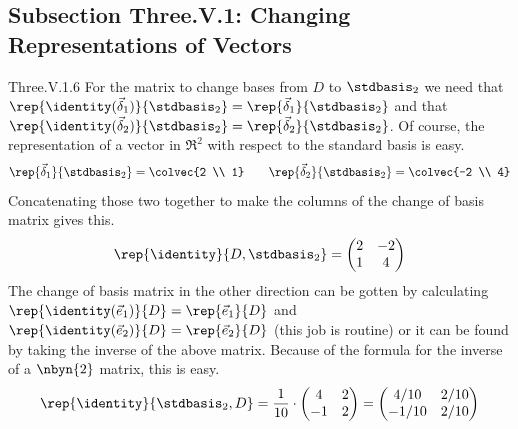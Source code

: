 \subsection{Subsection Three.V.1: Changing Representations of Vectors}
\begin{ans}{Three.V.1.6}
      For the matrix to change bases from $D$ to $\stdbasis_2$ we need that
      $\rep{\identity(\vec{\delta}_1)}{\stdbasis_2}
        =\rep{\vec{\delta}_1}{\stdbasis_2}$
      and that
      $\rep{\identity(\vec{\delta}_2)}{\stdbasis_2}
        =\rep{\vec{\delta}_2}{\stdbasis_2}$.
      Of course, the representation of a vector in $\Re^2$ with respect to
      the standard basis is easy.
      \begin{equation*}
        \rep{\vec{\delta}_1}{\stdbasis_2}=\colvec{2 \\ 1}
        \qquad
        \rep{\vec{\delta}_2}{\stdbasis_2}=\colvec{-2 \\ 4}
      \end{equation*}
      Concatenating those two together to make the columns of the change of
      basis matrix gives this.
      \begin{equation*}
        \rep{\identity}{D,\stdbasis_2}
        =\begin{pmatrix}
          2     &-2    \\
          1     &4
        \end{pmatrix}
      \end{equation*}
      The change of basis matrix in the other direction can be gotten by
      calculating $\rep{\identity(\vec{e}_1)}{D}=\rep{\vec{e}_1}{D}$ and
      $\rep{\identity(\vec{e}_2)}{D}=\rep{\vec{e}_2}{D}$ (this job is routine)
      or it can be found by taking the inverse of the above matrix.
      Because of the formula for the inverse of a $\nbyn{2}$ matrix,
      this is easy.
      \begin{equation*}
        \rep{\identity}{\stdbasis_2,D}=
        \frac{1}{10}\cdot\begin{pmatrix}
          4  &2  \\
         -1  &2
        \end{pmatrix}
        =\begin{pmatrix}
          4/10  &2/10  \\
         -1/10  &2/10
        \end{pmatrix}
      \end{equation*}
    
\end{ans}
